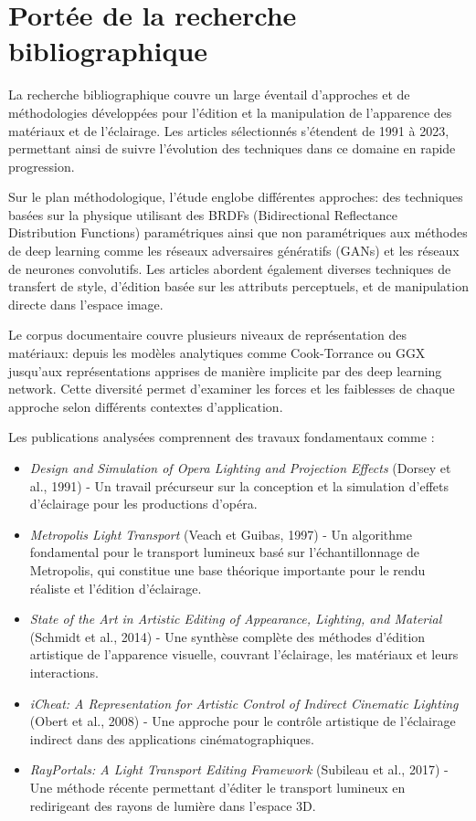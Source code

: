 \documentclass{article}
\begin{document}
\newpage
\section{Portée de la recherche bibliographique}

La recherche bibliographique couvre un large éventail d'approches et de méthodologies développées pour l'édition et la manipulation de l'apparence des matériaux et de l'éclairage. Les articles sélectionnés s'étendent de 1991 à 2023, permettant ainsi de suivre l'évolution des techniques dans ce domaine en rapide progression.

Sur le plan méthodologique, l'étude englobe différentes approches: des techniques basées sur la physique utilisant des BRDFs (Bidirectional Reflectance Distribution Functions) paramétriques ainsi que non paramétriques aux méthodes de deep learning comme les réseaux adversaires génératifs (GANs) et les réseaux de neurones convolutifs. Les articles abordent également diverses techniques de transfert de style, d'édition basée sur les attributs perceptuels, et de manipulation directe dans l'espace image.

Le corpus documentaire couvre plusieurs niveaux de représentation des matériaux: depuis les modèles analytiques comme Cook-Torrance ou GGX jusqu'aux représentations apprises de manière implicite par des deep learning network. Cette diversité permet d'examiner les forces et les faiblesses de chaque approche selon différents contextes d'application.

Les publications analysées comprennent des travaux fondamentaux comme :

\begin{itemize}
\item \textit{Design and Simulation of Opera Lighting and Projection Effects} (Dorsey et al., 1991) - Un travail précurseur sur la conception et la simulation d'effets d'éclairage pour les productions d'opéra.

\item \textit{Metropolis Light Transport} (Veach et Guibas, 1997) - Un algorithme fondamental pour le transport lumineux basé sur l'échantillonnage de Metropolis, qui constitue une base théorique importante pour le rendu réaliste et l'édition d'éclairage.

\item \textit{State of the Art in Artistic Editing of Appearance, Lighting, and Material} (Schmidt et al., 2014) - Une synthèse complète des méthodes d'édition artistique de l'apparence visuelle, couvrant l'éclairage, les matériaux et leurs interactions.

\item \textit{iCheat: A Representation for Artistic Control of Indirect Cinematic Lighting} (Obert et al., 2008) - Une approche pour le contrôle artistique de l'éclairage indirect dans des applications cinématographiques.

\item \textit{RayPortals: A Light Transport Editing Framework} (Subileau et al., 2017) - Une méthode récente permettant d'éditer le transport lumineux en redirigeant des rayons de lumière dans l'espace 3D.
\end{itemize}
\end{document}
